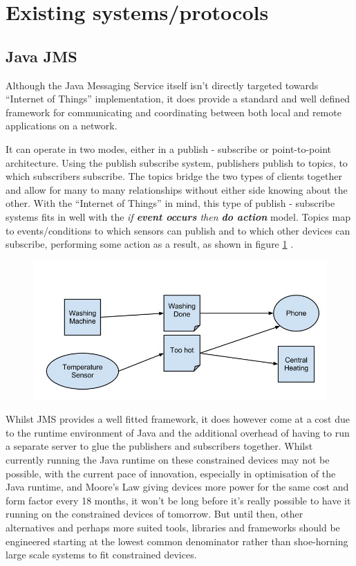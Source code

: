 
\section{Existing systems/protocols} %
\label{sec:existing_systems_protocols}

\subsection{Java JMS} %
\label{sub:java_jms}
Although the Java Messaging Service itself isn't directly targeted towards ``Internet of Things'' implementation, it does provide a standard and well defined framework for communicating and coordinating between both local and remote applications on a network. 

It can operate in two modes, either in a publish - subscribe or point-to-point architecture. Using the publish subscribe system, publishers publish to topics, to which subscribers subscribe. The topics bridge the two types of clients together and allow for many to many relationships without either side knowing about the other. With the ``Internet of Things'' in mind, this type of publish - subscribe systems fits in well with the \textit{if \textbf{event occurs} then \textbf{do action}} model. Topics map to events/conditions to which sensors can publish and to which other devices can subscribe, performing some action as a result, as shown in figure \ref{fig:JMS} .

\begin{figure}[h!]
	\centering
		\includegraphics[scale=0.4]{images/JMS-IoT.jpg}
		\label{fig:JMS}
\end{figure}


Whilst JMS provides a well fitted framework, it does however come at a cost due to the runtime environment of Java and the additional overhead of having to run a separate server to glue the publishers and subscribers together. Whilst currently running the Java runtime on these constrained devices may not be possible, with the current pace of innovation, especially in optimisation of the Java runtime, and Moore's Law giving devices more power for the same cost and form factor every 18 months, it won't be long before it's really possible to have it running on the constrained devices of tomorrow. But until then, other alternatives and perhaps more suited tools, libraries and frameworks should be engineered starting at the lowest common denominator rather than shoe-horning large scale systems to fit constrained devices.


